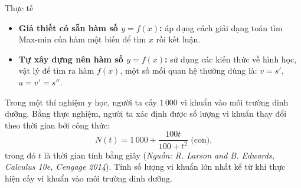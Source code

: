 \begin{dang}{Thực tế}
    \begin{itemize}
        \item \textbf{Giả thiết có sẵn hàm số $y=f(x)$:} áp dụng cách giải dạng toán tìm Max-min của hàm một biến để tìm $x$ rồi kết luận.
        \item \textbf{Tự xây dựng nên hàm số $y=f(x)$:} sử dụng các kiến thức về hình học, vật lý để tìm ra hàm $f(x)$, một số mối quan hệ thường dùng là: $v=s'$, $a=v'=s''$.
    \end{itemize}
\end{dang}
\begin{vd}
    Trong một thí nghiệm y học, người ta cấy $1\,000$ vi khuẩn vào môi trường dinh dưỡng. Bằng thực nghiệm, người ta xác định được số lượng vi khuẩn thay đổi theo thời gian bởi công thức: $$N(t)=1\,000+\dfrac{100t}{100+t^2}\text{ (con),}$$ trong đó $t$ là thời gian tính bằng giây (\textit{Nguồn: R. Larson and B. Edwards, Calculus 10e, Cengage 2014}). Tính số lượng vi khuẩn lớn nhất kể từ khi thực hiện cấy vi khuẩn vào môi trường dinh dưỡng.
\end{vd}
